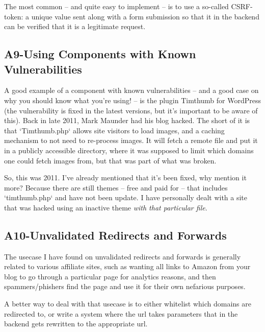 The most common -- and quite easy to implement -- is to use a so-called CSRF-token: a unique value sent along with a form submission so that it in the backend can be verified that it is a legitimate request.

\subsection{A9-Using Components with Known Vulnerabilities}
\noindent
A good example of a component with known vulnerabilities -- and a good case on why you should know what you're using! -- is the plugin Timthumb for WordPress (the vulnerability is fixed in the latest versions, but it's important to be aware of this). Back in late 2011, Mark Maunder \citep{MarMaunder2011} had his blog hacked. The short of it is that `Timthumb.php` allows site visitors to load images, and a caching mechanism to not need to re-process images. It will fetch a remote file and put it in a publicly accessible directory, where it was supposed to limit which domains one could fetch images from, but that was part of what was broken.

So, this was 2011. I've already mentioned that it's been fixed, why mention it more? Because there are still themes -- free and paid for -- that includes `timthumb.php` and have not been update. I have personally dealt with a site that was hacked using an inactive theme \emph{with that particular file}.

\subsection{A10-Unvalidated Redirects and Forwards}
\noindent
The usecase I have found on unvalidated redirects and forwards is generally related to various affiliate sites, such as wanting all links to Amazon from your blog to go through a particular page for analytics reasons, and then spammers/phishers find the page and use it for their own nefarious purposes.

A better way to deal with that usecase is to either whitelist which domains are redirected to, or write a system where the url takes parameters that in the backend gets rewritten to the appropriate url.


